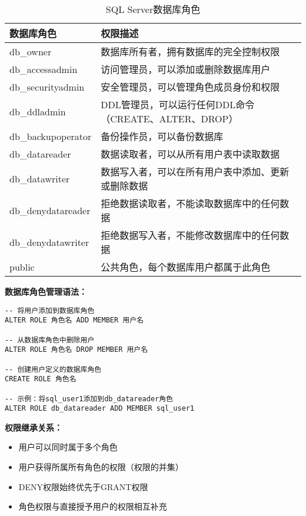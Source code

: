 \begin{table}[H]
  \centering
  \begin{tabularx}{\textwidth}{p{4cm}|X}
    \toprule
    \textbf{数据库角色} & \textbf{权限描述} \\
    \hline
    db\_owner & 数据库所有者，拥有数据库的完全控制权限 \\
    db\_accessadmin & 访问管理员，可以添加或删除数据库用户 \\
    db\_securityadmin & 安全管理员，可以管理角色成员身份和权限 \\
    db\_ddladmin & DDL管理员，可以运行任何DDL命令（CREATE、ALTER、DROP） \\
    db\_backupoperator & 备份操作员，可以备份数据库 \\
    db\_datareader & 数据读取者，可以从所有用户表中读取数据 \\
    db\_datawriter & 数据写入者，可以在所有用户表中添加、更新或删除数据 \\
    db\_denydatareader & 拒绝数据读取者，不能读取数据库中的任何数据 \\
    db\_denydatawriter & 拒绝数据写入者，不能修改数据库中的任何数据 \\
    public & 公共角色，每个数据库用户都属于此角色 \\
    \bottomrule
  \end{tabularx}
  \caption{SQL Server数据库角色}
  \label{table:4}
\end{table}

\qquad \textbf{数据库角色管理语法：}

\begin{mdframed}[backgroundcolor=gray!10]
\begin{verbatim}
-- 将用户添加到数据库角色
ALTER ROLE 角色名 ADD MEMBER 用户名

-- 从数据库角色中删除用户
ALTER ROLE 角色名 DROP MEMBER 用户名

-- 创建用户定义的数据库角色
CREATE ROLE 角色名

-- 示例：将sql_user1添加到db_datareader角色
ALTER ROLE db_datareader ADD MEMBER sql_user1
\end{verbatim}
\end{mdframed}

\qquad \textbf{权限继承关系：}

\begin{itemize}
  \item 用户可以同时属于多个角色
  \item 用户获得所属所有角色的权限（权限的并集）
  \item DENY权限始终优先于GRANT权限
  \item 角色权限与直接授予用户的权限相互补充
\end{itemize}
